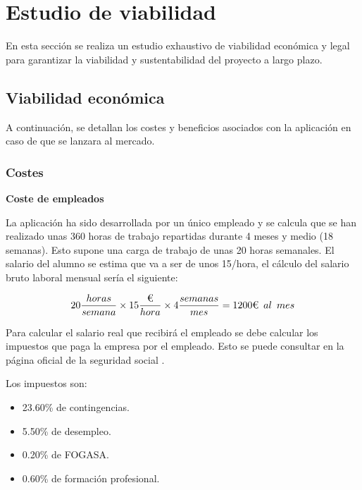 \clearpage

\section{Estudio de viabilidad}
En esta sección se realiza un estudio exhaustivo de viabilidad económica y legal para garantizar la viabilidad y sustentabilidad del proyecto a largo plazo.

\hfill

\subsection{Viabilidad económica}

A continuación, se detallan los costes y beneficios asociados con la aplicación en caso de que se lanzara al mercado.

\subsubsection{Costes}

\hfill

\textbf{Coste de empleados}

La aplicación ha sido desarrollada por un único empleado y se calcula que se han realizado unas 360 horas de trabajo repartidas durante 4 meses y medio (18 semanas). Esto supone una carga de trabajo de unas 20 horas semanales. El salario del alumno se estima que va a ser de unos 15/hora, el cálculo del salario bruto laboral mensual sería el siguiente:

$$ 20\frac{horas}{semana}\times15\frac{\text{€}}{hora}\times4\frac{semanas}{mes}=1200\text{€}\hspace{0.5em}al\hspace{0.5em}mes  $$

Para calcular el salario real que recibirá el empleado se debe calcular los impuestos que paga la empresa por el empleado. Esto se puede consultar en la página oficial de la seguridad social \cite{ss}.

\hfill

Los impuestos son:
\begin{itemize}
\tightlist
    \item 23.60\% de contingencias.
    \item 5.50\% de desempleo.
    \item 0.20\% de FOGASA.
    \item 0.60\% de formación profesional.
\end{itemize}

